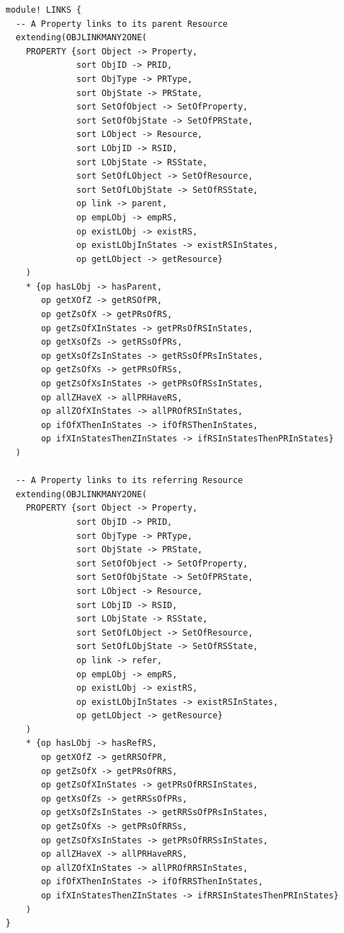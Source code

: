 \documentclass[12pt]{report}
\begin{document}
\begin{verbatim}
module! LINKS {
  -- A Property links to its parent Resource
  extending(OBJLINKMANY2ONE(
    PROPERTY {sort Object -> Property,
              sort ObjID -> PRID,
              sort ObjType -> PRType,
              sort ObjState -> PRState,
              sort SetOfObject -> SetOfProperty,
              sort SetOfObjState -> SetOfPRState,
              sort LObject -> Resource,
              sort LObjID -> RSID,
              sort LObjState -> RSState,
              sort SetOfLObject -> SetOfResource,
              sort SetOfLObjState -> SetOfRSState,
              op link -> parent,
              op empLObj -> empRS,
              op existLObj -> existRS,
              op existLObjInStates -> existRSInStates,
              op getLObject -> getResource}
    )
    * {op hasLObj -> hasParent,
       op getXOfZ -> getRSOfPR,
       op getZsOfX -> getPRsOfRS,
       op getZsOfXInStates -> getPRsOfRSInStates,
       op getXsOfZs -> getRSsOfPRs,
       op getXsOfZsInStates -> getRSsOfPRsInStates,
       op getZsOfXs -> getPRsOfRSs,
       op getZsOfXsInStates -> getPRsOfRSsInStates,
       op allZHaveX -> allPRHaveRS,
       op allZOfXInStates -> allPROfRSInStates,
       op ifOfXThenInStates -> ifOfRSThenInStates,
       op ifXInStatesThenZInStates -> ifRSInStatesThenPRInStates}
  )

  -- A Property links to its referring Resource
  extending(OBJLINKMANY2ONE(
    PROPERTY {sort Object -> Property,
              sort ObjID -> PRID,
              sort ObjType -> PRType,
              sort ObjState -> PRState,
              sort SetOfObject -> SetOfProperty,
              sort SetOfObjState -> SetOfPRState,
              sort LObject -> Resource,
              sort LObjID -> RSID,
              sort LObjState -> RSState,
              sort SetOfLObject -> SetOfResource,
              sort SetOfLObjState -> SetOfRSState,
              op link -> refer,
              op empLObj -> empRS,
              op existLObj -> existRS,
              op existLObjInStates -> existRSInStates,
              op getLObject -> getResource}
    )
    * {op hasLObj -> hasRefRS,
       op getXOfZ -> getRRSOfPR,
       op getZsOfX -> getPRsOfRRS,
       op getZsOfXInStates -> getPRsOfRRSInStates,
       op getXsOfZs -> getRRSsOfPRs,
       op getXsOfZsInStates -> getRRSsOfPRsInStates,
       op getZsOfXs -> getPRsOfRRSs,
       op getZsOfXsInStates -> getPRsOfRRSsInStates,
       op allZHaveX -> allPRHaveRRS,
       op allZOfXInStates -> allPROfRRSInStates,
       op ifOfXThenInStates -> ifOfRRSThenInStates,
       op ifXInStatesThenZInStates -> ifRRSInStatesThenPRInStates}
    )
}
\end{verbatim}
\end{document}
